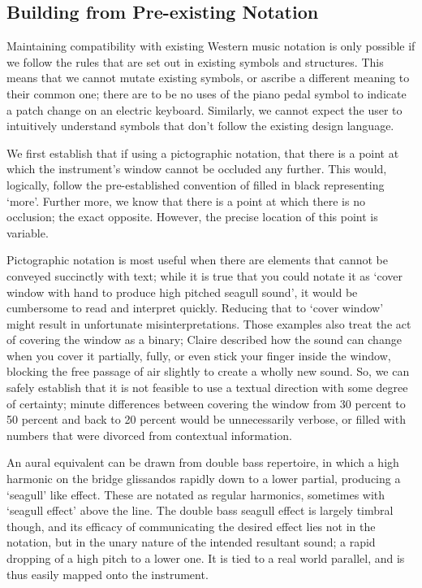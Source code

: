\subsection{Building from Pre-existing Notation}

Maintaining compatibility with existing Western music notation is only possible if we follow the rules that are set out in existing symbols and structures.
This means that we cannot mutate existing symbols, or ascribe a different meaning to their common one; there are to be no uses of the piano pedal symbol to indicate a patch change on an electric keyboard.
Similarly, we cannot expect the user to intuitively understand symbols that don't follow the existing design language.

We first establish that if using a pictographic notation, that there is a point at which the instrument's window cannot be occluded any further. 
This would, logically, follow the pre-established convention of filled in black representing `more'. 
Further more, we know that there is a point at which there is no occlusion; the exact opposite. 
However, the precise location of this point is variable.

Pictographic notation is most useful when there are elements that cannot be conveyed succinctly with text; while it is true that you could notate it as `cover window with hand to produce high pitched seagull sound', it would be cumbersome to read and interpret quickly.
Reducing that to `cover window' might result in unfortunate misinterpretations. 
Those examples also treat the act of covering the window as a binary; Claire described how the sound can change when you cover it partially, fully, or even stick your finger inside the window, blocking the free passage of air slightly to create a wholly new sound. 
So, we can safely establish that it is not feasible to use a textual direction with some degree of certainty; 
minute differences between covering the window from 30 percent to 50 percent and back to 20 percent would be unnecessarily verbose, or filled with numbers that were divorced from contextual information.

An aural equivalent can be drawn from double bass repertoire, in which a high harmonic on the bridge glissandos rapidly down to a lower partial, producing a `seagull' like effect. 
These are notated as regular harmonics, sometimes with `seagull effect' above the line. 
The double bass seagull effect is largely timbral though, and its efficacy of communicating the desired effect lies not in the notation, but in the unary nature of the intended resultant sound; a rapid dropping of a high pitch to a lower one. 
It is tied to a real world parallel, and is thus easily mapped onto the instrument.

